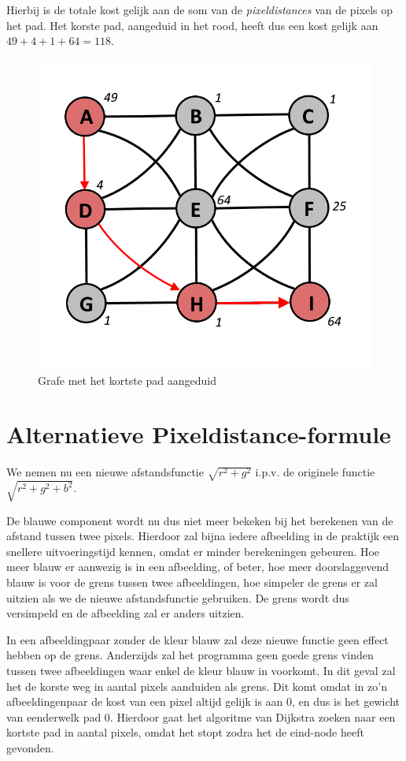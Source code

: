 \documentclass{article}
\begin{document}
Hierbij is de totale kost gelijk aan de som van de \textit{pixeldistances} van de pixels op het pad. Het korste pad, aangeduid in het rood, heeft dus een kost gelijk aan $ 49 + 4 + 1 + 64 = 118 $.

\begin{figure}[h!]
\centering
\includegraphics[scale=0.5]{Grafe.png}
\caption{Grafe met het kortste pad aangeduid}
\label{fig:Graph}
\end{figure}

\newpage
\section{Alternatieve Pixeldistance-formule}
We nemen nu een nieuwe afstandsfunctie $ \sqrt{r^2 + g^2} $ i.p.v. de originele functie $ \sqrt{r^2 + g^2 + b^2} $.

De blauwe component wordt nu dus niet meer bekeken bij het berekenen van de afstand tussen twee pixels. Hierdoor zal bijna iedere
afbeelding in de praktijk een snellere uitvoeringstijd kennen, omdat er minder berekeningen gebeuren. Hoe meer blauw er aanwezig is
in een afbeelding, of beter, hoe meer doorslaggevend blauw is voor de grens tussen twee afbeeldingen, hoe simpeler de grens er zal uitzien
als we de nieuwe afstandsfunctie gebruiken. De grens wordt dus versimpeld en de afbeelding zal er anders uitzien.

In een afbeeldingpaar zonder de kleur blauw zal deze nieuwe functie geen effect hebben op de grens. Anderzijds zal het programma geen goede grens vinden tussen
twee afbeeldingen waar enkel de kleur blauw in voorkomt. In dit geval zal het de korste weg in aantal pixels aanduiden als grens.
Dit komt omdat in zo'n afbeeldingenpaar de kost van een pixel altijd gelijk is aan 0, en dus is het gewicht van eenderwelk pad 0. Hierdoor gaat
het algoritme van Dijkstra zoeken naar een kortste pad in aantal pixels, omdat het stopt zodra het de eind-node heeft gevonden.
\end{document}
